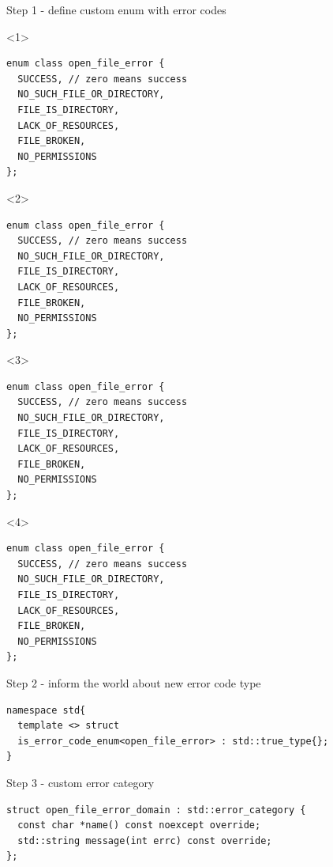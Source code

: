 \documentclass[10pt]{beamer}
\begin{document}
\begin{frame}[fragile]{Step 1 - define custom enum with error codes}
	\begin{onlyenv}
	\begin{verbatim}
enum class open_file_error {
  SUCCESS, // zero means success
  NO_SUCH_FILE_OR_DIRECTORY,
  FILE_IS_DIRECTORY,
  LACK_OF_RESOURCES,
  FILE_BROKEN,
  NO_PERMISSIONS
};
	\end{verbatim}
	\end{onlyenv}

	\begin{onlyenv}
	\begin{verbatim}
enum class open_file_error {
  SUCCESS, // zero means success
  NO_SUCH_FILE_OR_DIRECTORY,
  FILE_IS_DIRECTORY,
  LACK_OF_RESOURCES,
  FILE_BROKEN,
  NO_PERMISSIONS
};
\end{verbatim}
	\end{onlyenv}

	\begin{onlyenv}
	\begin{verbatim}
enum class open_file_error {
  SUCCESS, // zero means success
  NO_SUCH_FILE_OR_DIRECTORY,
  FILE_IS_DIRECTORY,
  LACK_OF_RESOURCES,
  FILE_BROKEN,
  NO_PERMISSIONS
};
\end{verbatim}
	\end{onlyenv}

	\begin{onlyenv}
	\begin{verbatim}
enum class open_file_error {
  SUCCESS, // zero means success
  NO_SUCH_FILE_OR_DIRECTORY,
  FILE_IS_DIRECTORY,
  LACK_OF_RESOURCES,
  FILE_BROKEN,
  NO_PERMISSIONS
};
\end{verbatim}
	\end{onlyenv}

\end{frame}

\begin{frame}[fragile]{Step 2 - inform the world about new error code type}
\begin{verbatim}
namespace std{
  template <> struct
  is_error_code_enum<open_file_error> : std::true_type{};
}
\end{verbatim}
	
\end{frame}

\begin{frame}[fragile]{Step 3 - custom error category}
	
	\begin{verbatim}
struct open_file_error_domain : std::error_category {
  const char *name() const noexcept override;		
  std::string message(int errc) const override;
};
	\end{verbatim}
\end{frame}
\end{document}
